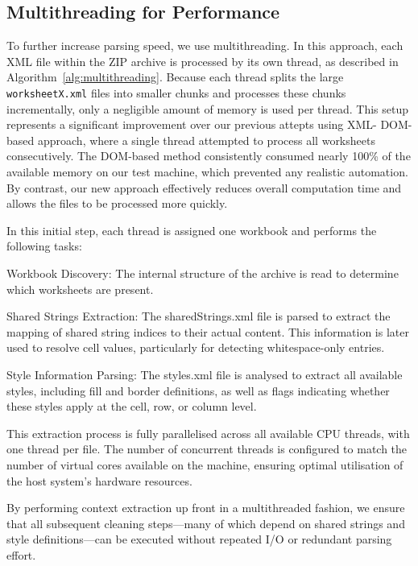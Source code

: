 \subsection{Multithreading for Performance}
To further increase parsing speed, we use multithreading. In this approach, each XML file within the ZIP archive is processed by its own thread, as described in Algorithm~\ref{alg:multithreading}. Because each thread splits the large \texttt{worksheetX.xml} files into smaller chunks and processes these chunks incrementally, only a negligible amount of memory is used per thread. This setup represents a significant improvement over our previous attepts using XML- DOM-based approach, where a single thread attempted to process all worksheets consecutively. The DOM-based method consistently consumed nearly 100\% of the available memory on our test machine, which prevented any realistic automation. By contrast, our new approach effectively reduces overall computation time and allows the files to be processed more quickly.

In this initial step, each thread is assigned one workbook and performs the following tasks:

Workbook Discovery: The internal structure of the archive is read to determine which worksheets are present.

Shared Strings Extraction: The sharedStrings.xml file is parsed to extract the mapping of shared string indices to their actual content. This information is later used to resolve cell values, particularly for detecting whitespace-only entries.

Style Information Parsing: The styles.xml file is analysed to extract all available styles, including fill and border definitions, as well as flags indicating whether these styles apply at the cell, row, or column level.

This extraction process is fully parallelised across all available CPU threads, with one thread per file. The number of concurrent threads is configured to match the number of virtual cores available on the machine, ensuring optimal utilisation of the host system’s hardware resources.

By performing context extraction up front in a multithreaded fashion, we ensure that all subsequent cleaning steps—many of which depend on shared strings and style definitions—can be executed without repeated I/O or redundant parsing effort.




